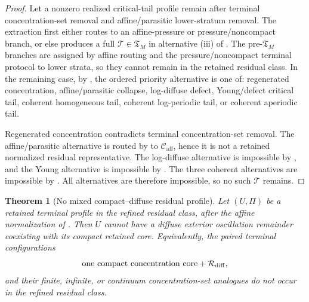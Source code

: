 \documentclass[11pt]{amsart}
\numberwithin{equation}{section}
\theoremstyle{plain}
\newtheorem{theorem}{Theorem}[section]
\theoremstyle{definition}
\theoremstyle{remark}
\newcommand{\Caff}{\mathcal C_{\mathrm{aff}}}
\newcommand{\Tcrit}{\mathfrak T_M}
\begin{document}
\begin{proof}
Let a nonzero realized critical-tail profile remain after terminal
concentration-set removal and affine/parasitic lower-stratum removal.  The
extraction first either routes to an affine-pressure or pressure/noncompact
branch, or else produces a full
\(\mathcal T\in\Tcrit\) in alternative \textup{(iii)} of
.  The pre-\(\Tcrit\)
branches are assigned by affine routing and the pressure/noncompact terminal
protocol to lower strata, so they cannot remain in the retained residual class.
In the
remaining case, by , the ordered
priority alternative is one of: regenerated concentration, affine/parasitic
collapse, log-diffuse defect, Young/defect critical tail, coherent homogeneous
tail, coherent log-periodic tail, or coherent aperiodic tail.

Regenerated concentration contradicts terminal concentration-set removal.  The
affine/parasitic alternative is routed by
 to \(\Caff\), hence it is not a
retained normalized residual representative.  The log-diffuse alternative is
impossible by , and the Young
alternative is impossible by .  The three coherent alternatives are impossible by
.  All alternatives are
therefore impossible, so no such \(\mathcal T\) remains.
\end{proof}

\begin{theorem}[No mixed compact--diffuse residual profile]
\label{thm:no-mixed-compact-diffuse}
Let \((U,\Pi)\) be a retained terminal profile in the refined residual class,
after the affine normalization of .
Then \(U\) cannot have a diffuse exterior oscillation remainder coexisting with
its compact retained core.  Equivalently, the paired terminal configurations
\[
   \hbox{one compact concentration core}+\mathcal R_{\rm diff},
\]
and their finite, infinite, or continuum concentration-set analogues do not occur in
the refined residual class.
\end{theorem}
\end{document}
